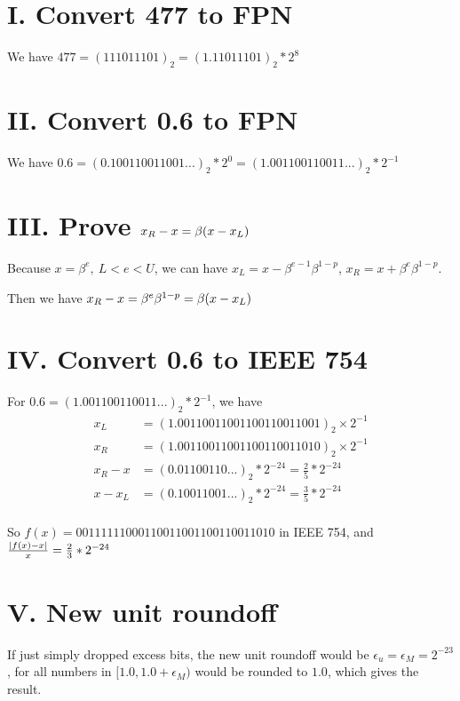 \documentclass[a4paper]{article}
\begin{document}
\section*{I. Convert 477 to FPN}

We have $477 = (111011101)_2 = (1.11011101)_2 * 2^8$

\section*{II. Convert 0.6 to FPN}

We have $0.6 = (0.100110011001...)_2 * 2^0 = (1.001100110011...)_2 * 2^{-1}$

\section*{III. Prove $x_R - x = \beta \qty(x-x_L)$}

Because $x = \beta^e, ~ L<e<U$, we can have $x_L = x - \beta^{e-1} \beta^{1-p}$, $x_R = x + \beta^e \beta^{1-p}$. 

Then we have $x_R - x = \beta^e \beta^{1-p} = \beta \qty(x-x_L)$

\section*{IV. Convert 0.6 to IEEE 754}

For $0.6 = (1.001100110011...)_2 * 2^{-1}$, we have
\begin{equation}
    \begin{aligned}
        x_L &= (1.00110011001100110011001)_2 \times 2^{-1} \\
        x_R &= (1.00110011001100110011010)_2 \times 2^{-1} \\
        x_R - x &= (0.01100110...)_2 * 2^{-24} = \frac{2}{5} * 2^{-24} \\
        x - x_L &= (0.10011001...)_2 * 2^{-24} = \frac{3}{5} * 2^{-24} \\
    \end{aligned}
\end{equation}

So $f(x) = 00111111000110011001100110011010$ in IEEE 754, and $\frac{\abs{f(x) - x}}{x} = \frac{2}{3} * 2^{-24}$

\section*{V. New unit roundoff}

If just simply dropped excess bits, the new unit roundoff would be $\epsilon_u = \epsilon_M = 2^{-23}$, for all numbers in $[1.0, 1.0+\epsilon_M)$ would be rounded to $1.0$, which gives the result. 
\end{document}
